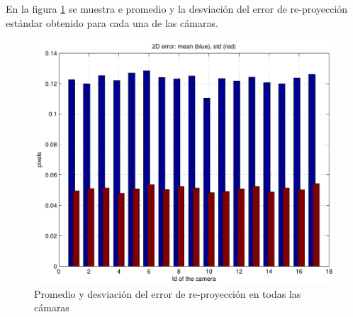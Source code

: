 En la figura \ref{fig: error reproyeccion} se muestra e promedio y la desviación del error de re-proyección estándar obtenido para cada una de las cámaras.

\begin{figure}[ht!]
\begin{center}
\includegraphics[scale=0.4]{img/calibracion/reprerrors.pdf}
\end{center}

\caption{Promedio y desviación  del error de re-proyección en todas las cámaras }
\label{fig: error reproyeccion}
\end{figure}
  






